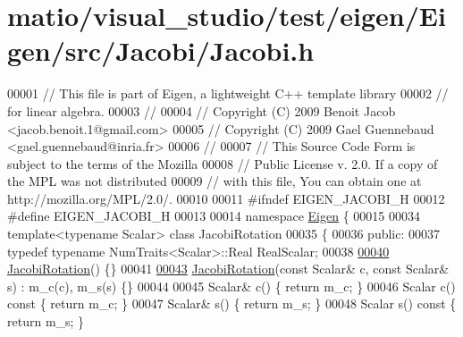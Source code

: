 \hypertarget{matio_2visual__studio_2test_2eigen_2_eigen_2src_2_jacobi_2_jacobi_8h_source}{}\section{matio/visual\+\_\+studio/test/eigen/\+Eigen/src/\+Jacobi/\+Jacobi.h}
\label{matio_2visual__studio_2test_2eigen_2_eigen_2src_2_jacobi_2_jacobi_8h_source}

\begin{DoxyCode}
00001 \textcolor{comment}{// This file is part of Eigen, a lightweight C++ template library}
00002 \textcolor{comment}{// for linear algebra.}
00003 \textcolor{comment}{//}
00004 \textcolor{comment}{// Copyright (C) 2009 Benoit Jacob <jacob.benoit.1@gmail.com>}
00005 \textcolor{comment}{// Copyright (C) 2009 Gael Guennebaud <gael.guennebaud@inria.fr>}
00006 \textcolor{comment}{//}
00007 \textcolor{comment}{// This Source Code Form is subject to the terms of the Mozilla}
00008 \textcolor{comment}{// Public License v. 2.0. If a copy of the MPL was not distributed}
00009 \textcolor{comment}{// with this file, You can obtain one at http://mozilla.org/MPL/2.0/.}
00010 
00011 \textcolor{preprocessor}{#ifndef EIGEN\_JACOBI\_H}
00012 \textcolor{preprocessor}{#define EIGEN\_JACOBI\_H}
00013 
00014 \textcolor{keyword}{namespace }\hyperlink{namespace_eigen}{Eigen} \{ 
00015 
00034 \textcolor{keyword}{template}<\textcolor{keyword}{typename} Scalar> \textcolor{keyword}{class }JacobiRotation
00035 \{
00036   \textcolor{keyword}{public}:
00037     \textcolor{keyword}{typedef} \textcolor{keyword}{typename} NumTraits<Scalar>::Real RealScalar;
00038 
\hyperlink{group___jacobi___module_a38fec2c4da529ef3d05ff37b848b4227}{00040}     \hyperlink{group___jacobi___module_a38fec2c4da529ef3d05ff37b848b4227}{JacobiRotation}() \{\}
00041 
\hyperlink{group___jacobi___module_a3e8b5dc0a56f7a2d0f788b1ccb1547cb}{00043}     \hyperlink{group___jacobi___module_a3e8b5dc0a56f7a2d0f788b1ccb1547cb}{JacobiRotation}(\textcolor{keyword}{const} Scalar& c, \textcolor{keyword}{const} Scalar& s) : m\_c(c), m\_s(s) \{\}
00044 
00045     Scalar& c() \{ \textcolor{keywordflow}{return} m\_c; \}
00046     Scalar c()\textcolor{keyword}{ const }\{ \textcolor{keywordflow}{return} m\_c; \}
00047     Scalar& s() \{ \textcolor{keywordflow}{return} m\_s; \}
00048     Scalar s()\textcolor{keyword}{ const }\{ \textcolor{keywordflow}{return} m\_s; \}

\end{DoxyCode}
